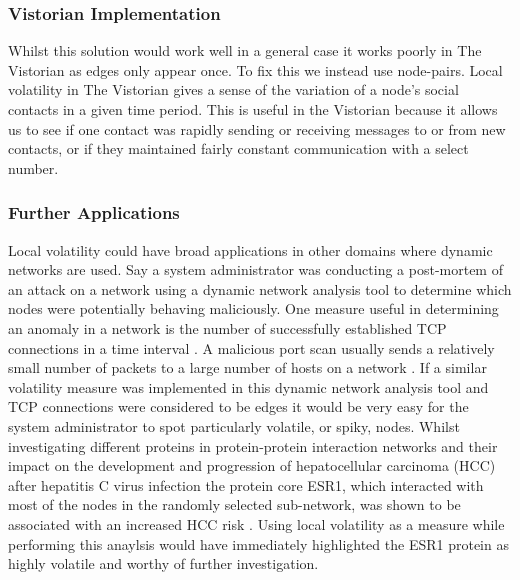 \subsubsection{Vistorian Implementation}
Whilst this solution would work well in a general case it works poorly in The Vistorian as edges only appear once. To fix this we instead use node-pairs. 
Local volatility in The Vistorian gives a sense of the variation of a node's social contacts in a given time period. This is useful in the Vistorian because it allows us to see if one contact was rapidly sending or receiving messages to or from new contacts, or if they maintained fairly constant communication with a select number. 


\subsubsection{Further Applications}
Local volatility could have broad applications in other domains where dynamic networks are used. 
\newline\newline
Say a system administrator was conducting a post-mortem of an attack on a network using a dynamic network analysis tool to determine which nodes were potentially behaving maliciously. One measure useful in determining an anomaly in a network is the number of successfully established TCP connections in a time interval \cite{fnpfid}. A malicious port scan usually sends a relatively small number of packets to a large number of hosts on a network \cite{fnpfid}. If a similar volatility measure was implemented in this dynamic network analysis tool and TCP connections were considered to be edges it would be very easy for the system administrator to spot particularly volatile, or spiky, nodes.
\newline\newline
Whilst investigating different proteins in protein-protein interaction networks and their impact on the development and progression of hepatocellular carcinoma (HCC) after hepatitis C virus infection the protein core ESR1, which interacted with most of the nodes in the randomly selected sub-network, was shown to be associated with an increased HCC risk \cite{acaotdbnihih}. Using local volatility as a measure while performing this anaylsis would have immediately highlighted the ESR1 protein as highly volatile and worthy of further investigation.


